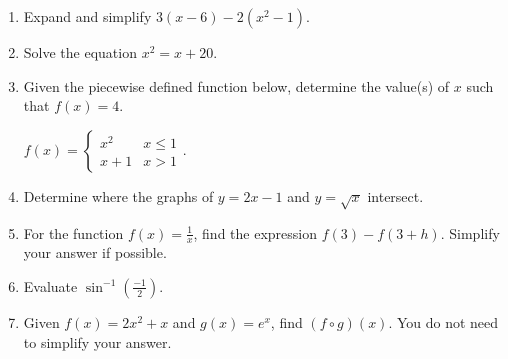 \documentclass[12pt]{article}
\begin{document}
\begin{enumerate}
\item Expand and simplify $3(x-6)-2(x^2-1).$

\quad \hfill \underline{\hspace{2in}}
\vfill

\item Solve the equation $x^2=x+20.$

\quad \hfill \underline{\hspace{2in}}
\vfill
\item Given the piecewise defined function below, determine the value(s) of $x$ such that $f(x)=4.$

$f(x)=\begin{cases} x^2 & x \leq 1 \\ x+1 & x >1 \end{cases}.$\\

\quad \hfill \underline{\hspace{2in}}
\vfill

\item Determine where the graphs of $y=2x-1$ and $y=\sqrt{x}$ intersect.\\


\quad \hfill \underline{\hspace{2in}}
\vfill

\item For the function $f(x)=\frac{1}{x}$, find the expression $f(3)-f(3+h).$ Simplify your answer if possible.\\


\quad \hfill \underline{\hspace{2in}}
\vfill
\newpage
\item Evaluate $\sin^{-1}(\frac{-1}{2}).$

\quad \hfill \underline{\hspace{2in}}
\vfill

\item Given $f(x)=2x^2+x$ and $g(x)=e^x$, find $(f \circ g)(x).$ You do not need to simplify your answer.\\ \quad \\

\quad \hfill \underline{\hspace{2in}}
\vfill



\end{enumerate}
\end{document}
